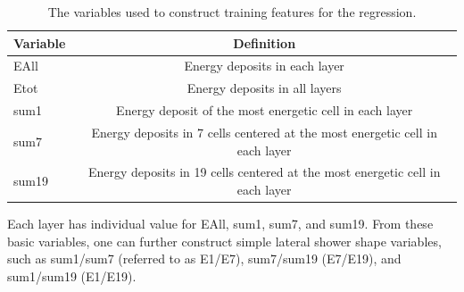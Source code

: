 \begin{table}[!ht]
  \begin{center}
    {\small
    \begin{tabular}{lc}
    	Variable &  Definition \\
    	\hline
    	EAll & Energy deposits in each layer \\
    	Etot & Energy deposits in all layers \\
    	sum1 & Energy deposit of the most energetic cell in each layer\\
    	sum7 & Energy deposits in 7 cells centered at the most energetic cell in each layer\\
    	sum19 & Energy deposits in 19 cells centered at the most energetic cell in each layer\\
    \end{tabular}
    }
  \end{center}
  \caption{The variables used to construct training features for the regression.  \label{tab:regression_feature}}
\end{table}

Each layer has individual value for EAll, sum1, sum7, and sum19. From these basic variables, one can further construct simple lateral shower shape variables, such as sum1/sum7 (referred to as E1/E7), sum7/sum19 (E7/E19), and sum1/sum19 (E1/E19). 

